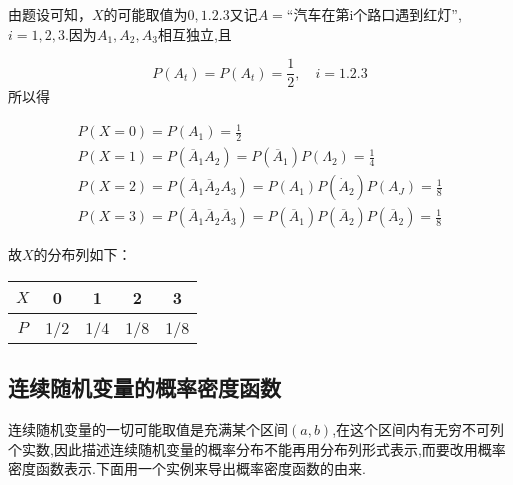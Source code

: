 \begin{solution}	
	由题设可知，$ X $的可能取值为$ 0,1.2.3 $又记$ A= $“汽车在第i个路口遇到红灯”,$ i=1,2,3 $.因为$ A_1,A_2,A_3 $相互独立,且
	
	\[
	P\left(A_{t}\right)=P\left(A_{t}\right)=\frac{1}{2}, \quad i=1.2 .3
	\]
	所以得
	
	\[
	\begin{array}{l}
	{P(X=0)=P\left(A_{1}\right)=\frac{1}{2}} \\
	{P(X=1)=P\left(\overline{A}_{1} A_{2}\right)=P\left(\overline{A}_{1}\right) P\left(\Lambda_{2}\right)=\frac{1}{4}} \\
	{P(X=2)=P\left(\overline{A}_{1} \overline{A}_{2} A_{3}\right)=P\left(A_{1}\right) P\left(\dot{A}_{2}\right) P\left(A_{J}\right)=\frac{1}{8}}\\
	{P(X=3)=P\left(\overline{A}_{1} \overline{A}_{2} \overline{A}_{3}\right)=P\left(\overline{A}_{1}\right) P\left(\overline{A}_{2}\right) P\left(\overline{A}_{2}\right)=\frac{1}{8}}
	\end{array}
	\]
	
	故$ X $的分布列如下：
	
	\begin{table}[htbp]
		\centering
		\begin{tabular}{c|cccc}
			$ X $     & 0     & 1     & 2     & 3 \\\hline
			$ P $     & 1/2   & 1/4   & 1/8   & 1/8 \\
		\end{tabular}%
	\end{table}%
	
\end{solution}

\subsection{连续随机变量的概率密度函数}

连续随机变量的一切可能取值是充满某个区间$ (a,b) $,在这个区间内有无穷不可列个实数,因此描述连续随机变量的概率分布不能再用分布列形式表示,而要改用概率密度函数表示.下面用一个实例来导出概率密度函数的由来.

